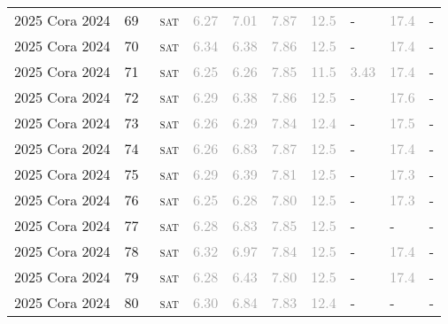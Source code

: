 \begin{center}
{\begin{longtable}{@{}llllllllll@{}}
2025 Cora 2024 & 69 & ~\textsc{sat} & \textcolor{darkgray}{6.27} & \textcolor{darkgray}{7.01} & \textcolor{darkgray}{7.87} & \textcolor{darkgray}{12.5} & - & \textcolor{darkgray}{17.4} & - \\
2025 Cora 2024 & 70 & ~\textsc{sat} & \textcolor{darkgray}{6.34} & \textcolor{darkgray}{6.38} & \textcolor{darkgray}{7.86} & \textcolor{darkgray}{12.5} & - & \textcolor{darkgray}{17.4} & - \\
2025 Cora 2024 & 71 & ~\textsc{sat} & \textcolor{darkgray}{6.25} & \textcolor{darkgray}{6.26} & \textcolor{darkgray}{7.85} & \textcolor{darkgray}{11.5} & \textcolor{darkgray}{3.43} & \textcolor{darkgray}{17.4} & - \\
2025 Cora 2024 & 72 & ~\textsc{sat} & \textcolor{darkgray}{6.29} & \textcolor{darkgray}{6.38} & \textcolor{darkgray}{7.86} & \textcolor{darkgray}{12.5} & - & \textcolor{darkgray}{17.6} & - \\
2025 Cora 2024 & 73 & ~\textsc{sat} & \textcolor{darkgray}{6.26} & \textcolor{darkgray}{6.29} & \textcolor{darkgray}{7.84} & \textcolor{darkgray}{12.4} & - & \textcolor{darkgray}{17.5} & - \\
2025 Cora 2024 & 74 & ~\textsc{sat} & \textcolor{darkgray}{6.26} & \textcolor{darkgray}{6.83} & \textcolor{darkgray}{7.87} & \textcolor{darkgray}{12.5} & - & \textcolor{darkgray}{17.4} & - \\
2025 Cora 2024 & 75 & ~\textsc{sat} & \textcolor{darkgray}{6.29} & \textcolor{darkgray}{6.39} & \textcolor{darkgray}{7.81} & \textcolor{darkgray}{12.5} & - & \textcolor{darkgray}{17.3} & - \\
2025 Cora 2024 & 76 & ~\textsc{sat} & \textcolor{darkgray}{6.25} & \textcolor{darkgray}{6.28} & \textcolor{darkgray}{7.80} & \textcolor{darkgray}{12.5} & - & \textcolor{darkgray}{17.3} & - \\
2025 Cora 2024 & 77 & ~\textsc{sat} & \textcolor{darkgray}{6.28} & \textcolor{darkgray}{6.83} & \textcolor{darkgray}{7.85} & \textcolor{darkgray}{12.5} & - & - & - \\
2025 Cora 2024 & 78 & ~\textsc{sat} & \textcolor{darkgray}{6.32} & \textcolor{darkgray}{6.97} & \textcolor{darkgray}{7.84} & \textcolor{darkgray}{12.5} & - & \textcolor{darkgray}{17.4} & - \\
2025 Cora 2024 & 79 & ~\textsc{sat} & \textcolor{darkgray}{6.28} & \textcolor{darkgray}{6.43} & \textcolor{darkgray}{7.80} & \textcolor{darkgray}{12.5} & - & \textcolor{darkgray}{17.4} & - \\
2025 Cora 2024 & 80 & ~\textsc{sat} & \textcolor{darkgray}{6.30} & \textcolor{darkgray}{6.84} & \textcolor{darkgray}{7.83} & \textcolor{darkgray}{12.4} & - & - & - \\

\end{longtable}}
\end{center}
